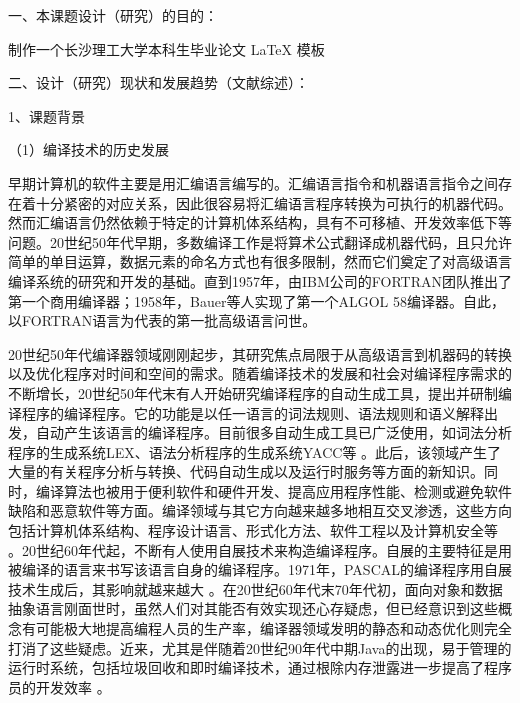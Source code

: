 \documentclass{csustThesis}
\begin{document}
\makeResearchProposalCover

\pagestyle{empty}  %

\begin{ubox}[breakable,]
\noindent 一、本课题设计（研究）的目的：

制作一个长沙理工大学本科生毕业论文 \LaTeX{} 模板

\quad 

\quad 

\quad 

\quad 

\end{ubox}

\vspace{-\baselineskip}

\begin{ubox}[breakable,]
\noindent 二、设计（研究）现状和发展趋势（文献综述）：

1、课题背景

（1）编译技术的历史发展

早期计算机的软件主要是用汇编语言编写的。汇编语言指令和机器语言指令之间存在着十分紧密的对应关系，因此很容易将汇编语言程序转换为可执行的机器代码。然而汇编语言仍然依赖于特定的计算机体系结构，具有不可移植、开发效率低下等问题\cite*{nanos2007}。20世纪50年代早期，多数编译工作是将算术公式翻译成机器代码，且只允许简单的单目运算，数据元素的命名方式也有很多限制，然而它们奠定了对高级语言编译系统的研究和开发的基础\cite*{xrhk2010_qtbyyl}。直到1957年，由IBM公司的FORTRAN团队推出了第一个商用编译器\cite*{mmpire2006,backus1957}；1958年，Bauer等人实现了第一个ALGOL 58编译器\cite*{kimpel2015}。自此，以FORTRAN语言为代表的第一批高级语言问世。

20世纪50年代编译器领域刚刚起步，其研究焦点局限于从高级语言到机器码的转换以及优化程序对时间和空间的需求。随着编译技术的发展和社会对编译程序需求的不断增长，20世纪50年代末有人开始研究编译程序的自动生成工具，提出并研制编译程序的编译程序。它的功能是以任一语言的词法规则、语法规则和语义解释出发，自动产生该语言的编译程序。目前很多自动生成工具已广泛使用，如词法分析程序的生成系统LEX、语法分析程序的生成系统YACC等\cite*{xrhk2010_qtbyyl, dragon_book} 。此后，该领域产生了大量的有关程序分析与转换、代码自动生成以及运行时服务等方面的新知识。同时，编译算法也被用于便利软件和硬件开发、提高应用程序性能、检测或避免软件缺陷和恶意软件等方面。编译领域与其它方向越来越多地相互交叉渗透，这些方向包括计算机体系结构、程序设计语言、形式化方法、软件工程以及计算机安全等\cite*{xrhk2010_wl50n} 。20世纪60年代起，不断有人使用自展技术来构造编译程序。自展的主要特征是用被编译的语言来书写该语言自身的编译程序。1971年，PASCAL的编译程序用自展技术生成后，其影响就越来越大\cite*{xrhk2010_qtbyyl} 。在20世纪60年代末70年代初，面向对象和数据抽象语言刚面世时，虽然人们对其能否有效实现还心存疑虑，但已经意识到这些概念有可能极大地提高编程人员的生产率，编译器领域发明的静态和动态优化则完全打消了这些疑虑。近来，尤其是伴随着20世纪90年代中期Java的出现，易于管理的运行时系统，包括垃圾回收和即时编译技术，通过根除内存泄露进一步提高了程序员的开发效率\cite*{xrhk2010_wl50n} 。


\end{ubox}
\end{document}
